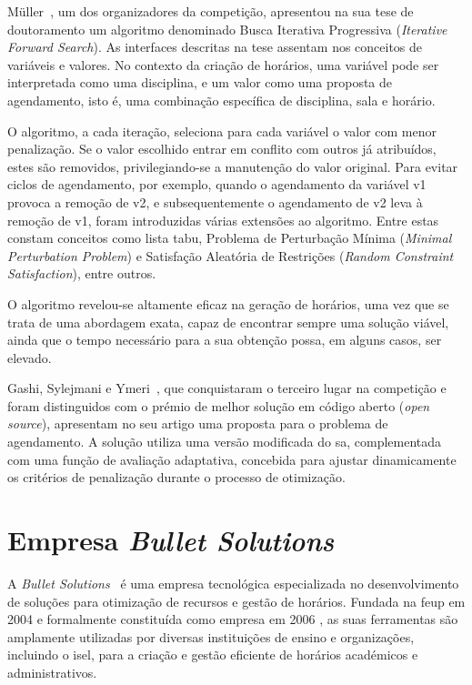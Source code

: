 Müller~\cite{ConstraintbasedTimetabling-Mueller}, um dos organizadores da competição, apresentou na sua tese de doutoramento um algoritmo denominado Busca Iterativa Progressiva (\textit{Iterative Forward Search}). As interfaces descritas na tese assentam nos conceitos de variáveis e valores. No contexto da criação de horários, uma variável pode ser interpretada como uma disciplina, e um valor como uma proposta de agendamento, isto é, uma combinação específica de disciplina, sala e horário. 

O algoritmo, a cada iteração, seleciona para cada variável o valor com menor penalização. Se o valor escolhido entrar em conflito com outros já atribuídos, estes são removidos, privilegiando-se a manutenção do valor original. Para evitar ciclos de agendamento, por exemplo, quando o agendamento da variável v1 provoca a remoção de v2, e subsequentemente o agendamento de v2 leva à remoção de v1, foram introduzidas várias extensões ao algoritmo. Entre estas constam conceitos como lista tabu, Problema de Perturbação Mínima (\textit{Minimal Perturbation Problem}) e Satisfação Aleatória de Restrições (\textit{Random Constraint Satisfaction}), entre outros.

O algoritmo revelou-se altamente eficaz na geração de horários, uma vez que se trata de uma abordagem exata, capaz de encontrar sempre uma solução viável, ainda que o tempo necessário para a sua obtenção possa, em alguns casos, ser elevado.

Gashi, Sylejmani e Ymeri~\cite{Simulatedannealingpenalization-Sylejmani-2022}, que conquistaram o terceiro lugar na competição e foram distinguidos com o prémio de melhor solução em código aberto (\textit{open source}), apresentam no seu artigo uma proposta para o problema de agendamento. A solução utiliza uma versão modificada do \gls{sa}, complementada com uma função de avaliação adaptativa, concebida para ajustar dinamicamente os critérios de penalização durante o processo de otimização.

\section{Empresa \textit{Bullet Solutions}}
\label{capitulo2:Bullet-Solutions}

A \textit{Bullet Solutions}~\cite{bulletsolutions-Website} é uma empresa tecnológica especializada no desenvolvimento de soluções para otimização de recursos e gestão de horários. Fundada na \gls{feup} em 2004 e formalmente constituída como empresa em 2006 \cite{bulletsolutions-foundation-information}, as suas ferramentas são amplamente utilizadas por diversas instituições de ensino e organizações, incluindo o \gls{isel}, para a criação e gestão eficiente de horários académicos e administrativos.

